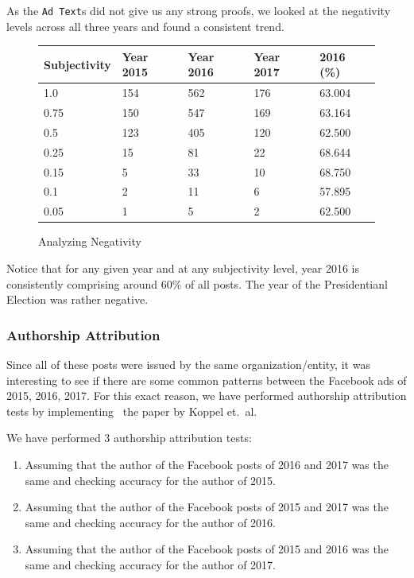\documentclass[12pt]{article}
\theoremstyle{definition}
\begin{document}
\bigskip

As the \texttt{Ad Text}s did not give us any strong proofs, we looked at the
negativity levels across all three years and found a consistent trend.

\begin{figure}[H]
\centering
\begin{tabular}{|p{3cm}|p{3cm}|p{3cm}|p{3cm}|p{3cm}|}
 \hline
 Subjectivity & Year 2015 & Year 2016 & Year 2017 & 2016 (\%)\\
 \hline
 1.0  & 154 & 562 & 176 & 63.004\\
 \hline
 0.75 & 150 & 547 & 169 & 63.164\\
 \hline
 0.5  & 123 & 405 & 120 & 62.500\\
 \hline
 0.25 & 15  & 81  & 22  & 68.644\\
 \hline
 0.15 & 5   & 33  & 10  & 68.750\\
 \hline
 0.1  & 2   & 11  & 6   & 57.895\\
 \hline
 0.05 & 1   & 5   & 2   & 62.500\\
 \hline
\end{tabular}
\caption*{Analyzing Negativity}
\end{figure}

\bigskip

Notice that for any given year and at any subjectivity level, year 2016 is
consistently comprising around 60\% of all posts. The year of the Presidentianl
Election was rather negative.


\subsubsection*{\centering Authorship Attribution}

Since all of these posts were issued by the same organization/entity, it was
interesting to see if there are some common patterns between the Facebook ads
of 2015, 2016, 2017. For this exact reason, we have performed authorship
attribution tests by implementing~\cite{koppel11} the paper by Koppel et.~al.

\bigskip

We have performed 3 authorship attribution tests:

\begin{enumerate}
  \item Assuming that the author of the Facebook posts of 2016 and 2017 was the
        same and checking accuracy for the author of 2015.

  \item Assuming that the author of the Facebook posts of 2015 and 2017 was the
        same and checking accuracy for the author of 2016.

  \item Assuming that the author of the Facebook posts of 2015 and 2016 was the
        same and checking accuracy for the author of 2017.
\end{enumerate}
\end{document}

